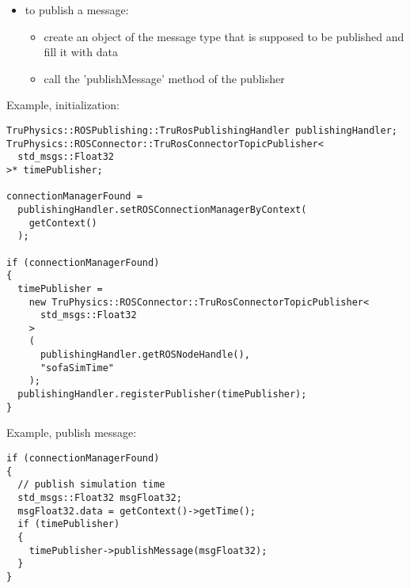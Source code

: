 \documentclass[a4paper, 10pt]{article}
\begin{document}
\begin{itemize}
    \item to publish a message: 
    \begin{itemize}
        \item create an object of the message type that is supposed to be published and fill it with data
        \item call the 'publishMessage' method of the publisher
    \end{itemize}

\end{itemize}
\clearpage
\noindent Example, initialization: 
\begin{lstlisting}[frame=single]
TruPhysics::ROSPublishing::TruRosPublishingHandler publishingHandler;
TruPhysics::ROSConnector::TruRosConnectorTopicPublisher<
  std_msgs::Float32
>* timePublisher;
    
connectionManagerFound =
  publishingHandler.setROSConnectionManagerByContext(
    getContext()
  );

if (connectionManagerFound)
{
  timePublisher =
    new TruPhysics::ROSConnector::TruRosConnectorTopicPublisher<
      std_msgs::Float32
    >
    (
      publishingHandler.getROSNodeHandle(),
      "sofaSimTime"
    );
  publishingHandler.registerPublisher(timePublisher);
}
\end{lstlisting}
Example, publish message:
\begin{lstlisting}[frame=single]
if (connectionManagerFound)
{
  // publish simulation time
  std_msgs::Float32 msgFloat32;
  msgFloat32.data = getContext()->getTime();
  if (timePublisher)
  {
    timePublisher->publishMessage(msgFloat32);
  }
}
\end{lstlisting}    
\end{document}
